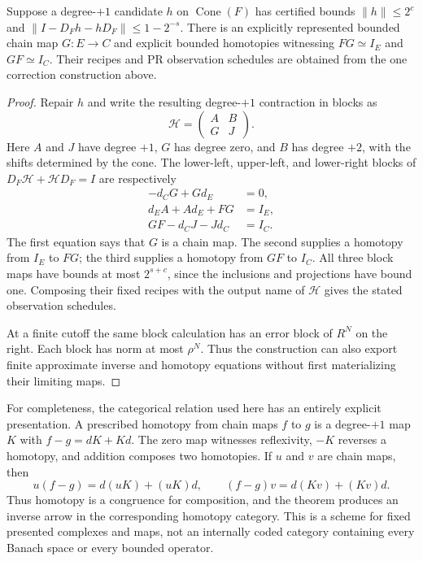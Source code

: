 \begin{theorem}
\label{thm:cone-homotopy-inverse}
Suppose a degree-$+1$ candidate $h$ on $\operatorname{Cone}(F)$ has
certified bounds $\|h\|\le2^c$ and
$\|I-D_Fh-hD_F\|\le1-2^{-s}$.
There is an explicitly represented bounded chain map
$G:E\longrightarrow C$ and explicit bounded homotopies witnessing
$FG\simeq I_E$ and $GF\simeq I_C$.
Their recipes and PR observation schedules are obtained from the one
correction construction above.
\end{theorem}
\begin{proof}
Repair $h$ and write the resulting degree-$+1$ contraction in blocks as
\[
                    \mathcal H=
                    \begin{pmatrix}A&B\\G&J\end{pmatrix}.
\]
Here $A$ and $J$ have degree $+1$, $G$ has degree zero, and $B$ has
degree $+2$, with the shifts determined by the cone.  The lower-left,
upper-left, and lower-right blocks of
$D_F\mathcal H+\mathcal H D_F=I$ are respectively
\begin{align*}
             -d_CG+Gd_E&=0,\\
               d_EA+Ad_E+FG&=I_E,\\
               GF-d_CJ-Jd_C&=I_C.
\end{align*}
The first equation says that $G$ is a chain map.  The second supplies
a homotopy from $I_E$ to $FG$; the third supplies a homotopy from $GF$
to $I_C$.  All three block maps have bounds at most
$2^{s+c}$, since the inclusions and projections have bound one.
Composing their fixed recipes with the output name of $\mathcal H$
gives the stated observation schedules.

At a finite cutoff the same block calculation has an error block of
$R^N$ on the right.  Each block has norm at most $\rho^N$.  Thus the
construction can also export finite approximate inverse and homotopy
equations without first materializing their limiting maps.
\end{proof}

For completeness, the categorical relation used here has an entirely
explicit presentation.  A prescribed homotopy from chain maps $f$ to $g$
is a degree-$+1$ map $K$ with $f-g=dK+Kd$.  The zero map witnesses
reflexivity, $-K$ reverses a homotopy, and addition composes two
homotopies.  If $u$ and $v$ are chain maps, then
\[
 u(f-g)=d(uK)+(uK)d,\qquad
 (f-g)v=d(Kv)+(Kv)d.
\]
Thus homotopy is a congruence for composition, and the theorem produces
an inverse arrow in the corresponding homotopy category.  This is a
scheme for fixed presented complexes and maps, not an internally coded
category containing every Banach space or every bounded operator.

